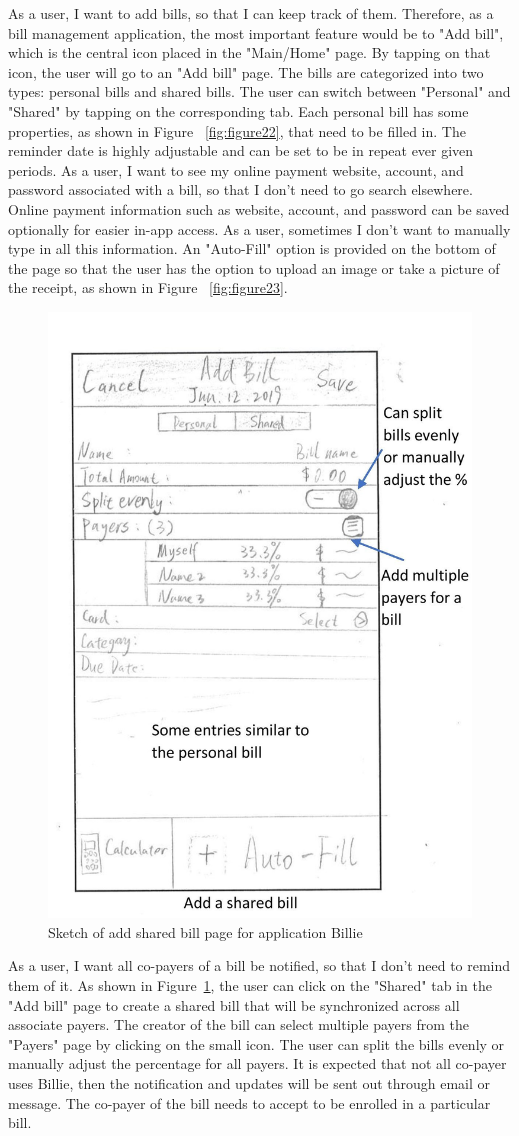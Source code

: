 \documentclass{sigchi}
\begin{document}
As a user, I want to add bills, so that I can keep track of them. Therefore, as a bill management application, the most important feature would be to "Add bill", which is the central icon placed in the "Main/Home" page. By tapping on that icon, the user will go to an "Add bill" page. The bills are categorized into two types: personal bills and shared bills. The user can switch between "Personal" and "Shared" by tapping on the corresponding tab. Each personal bill has some properties, as shown in Figure ~\ref{fig:figure22}, that need to be filled in. The reminder date is highly adjustable and can be set to be in repeat ever given periods. As a user, I want to see my online payment website, account, and password associated with a bill, so that I don't need to go search elsewhere. Online payment information such as website, account, and password can be saved optionally for easier in-app access. As a user, sometimes I don't want to manually type in all this information. An "Auto-Fill" option is provided on the bottom of the page so that the user has the option to upload an image or take a picture of the receipt, as shown in Figure ~\ref{fig:figure23}.

\begin{figure}[h!]
\centering
  \includegraphics[width=0.6\columnwidth]{9-add-shared-bill-page.jpg}
  \caption{Sketch of add shared bill page for application Billie}
  \label{fig:figure24}
\end{figure}

As a user, I want all co-payers of a bill be notified, so that I don't need to remind them of it. As shown in Figure~\ref{fig:figure24}, the user can click on the "Shared" tab in the "Add bill" page to create a shared bill that will be synchronized across all associate payers. The creator of the bill can select multiple payers from the "Payers" page by clicking on the small icon. The user can split the bills evenly or manually adjust the percentage for all payers. It is expected that not all co-payer uses Billie, then the notification and updates will be sent out through email or message. The co-payer of the bill needs to accept to be enrolled in a particular bill.
\end{document}
